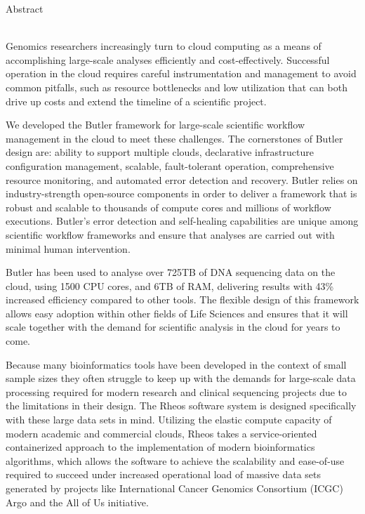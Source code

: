 \begin{Huge}
Abstract
\end{Huge}\\[1cm]
\noindent
Genomics researchers increasingly turn to cloud computing as a means of accomplishing large-scale analyses efficiently and cost-effectively. Successful operation in the cloud requires careful instrumentation and management to avoid common pitfalls, such as resource bottlenecks and low utilization that can both drive up costs and extend the timeline of a scientific project. 

We developed the Butler framework for large-scale scientific workflow management in the cloud to meet these challenges. The cornerstones of Butler design are: ability to support multiple clouds, declarative infrastructure configuration management, scalable, fault-tolerant operation, comprehensive resource monitoring, and automated error detection and recovery. Butler relies on industry-strength open-source components in order to deliver a framework that is robust and scalable to thousands of compute cores and millions of workflow executions. Butler’s error detection and self-healing capabilities are unique among scientific workflow frameworks and ensure that analyses are carried out with minimal human intervention.

Butler has been used to analyse over 725TB of DNA sequencing data on the cloud, using 1500 CPU cores, and 6TB of RAM, delivering results with 43\% increased efficiency compared to other tools. The flexible design of this framework allows easy adoption within other fields of Life Sciences and ensures that it will scale together with the demand for scientific analysis in the cloud for years to come.

Because many bioinformatics tools have been developed in the context of small sample sizes they often struggle to keep up with the demands for large-scale data processing required for modern research and clinical sequencing projects due to the limitations in their design. The Rheos software system is designed specifically with these large data sets in mind. Utilizing the elastic compute capacity of modern academic and commercial clouds, Rheos takes a service-oriented containerized approach to the implementation of modern bioinformatics algorithms, which allows the software to achieve the scalability and ease-of-use required to succeed under increased operational load of massive data sets generated by projects like International Cancer Genomics Consortium (ICGC) Argo and the All of Us initiative. 

